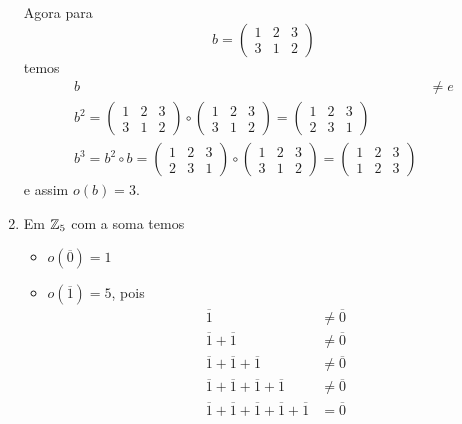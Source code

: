 \begin{exemplos}
\begin{enumerate}[label={\arabic*})]
        Agora para
        \[
            b = \begin{pmatrix}
                1 & 2 & 3\\
                3 & 1 & 2
            \end{pmatrix}
        \]
        temos
        \begin{align*}
            b &\ne e\\
            b^2 = \begin{pmatrix}
                1 & 2 & 3\\
                3 & 1 & 2
            \end{pmatrix} \circ \begin{pmatrix}
                1 & 2 & 3\\
                3 & 1 & 2
            \end{pmatrix} = \begin{pmatrix}
                1 & 2 & 3\\
                2 & 3 & 1
            \end{pmatrix}\\
            b^3 = b^2 \circ b = \begin{pmatrix}
                1 & 2 & 3\\
                2 & 3 & 1
            \end{pmatrix} \circ \begin{pmatrix}
                1 & 2 & 3\\
                3 & 1 & 2
            \end{pmatrix} = \begin{pmatrix}
                1 & 2 & 3\\
                1 & 2 & 3
            \end{pmatrix}
        \end{align*}
        e assim $o(b) = 3$.

        \item Em $\mathbb{Z}_5$ com a soma temos
        \begin{itemize}
            \item $o(\overline{0}) = 1$

            \item $o(\overline{1}) = 5$, pois
            \begin{align*}
                \overline{1} &\ne \overline{0}\\
                \overline{1} + \overline{1} &\ne \overline{0}\\
                \overline{1} + \overline{1} + \overline{1} &\ne \overline{0}\\
                \overline{1} + \overline{1} + \overline{1} + \overline{1} &\ne \overline{0}\\
                \overline{1} + \overline{1} + \overline{1} + \overline{1} + \overline{1} &= \overline{0}
            \end{align*}


\end{itemize}
\end{enumerate}
\end{exemplos}
